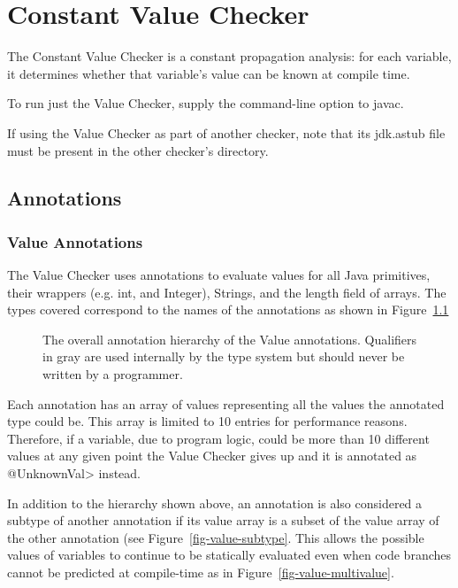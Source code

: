 \htmlhr
\chapter{Constant Value Checker\label{value-checker}}

The Constant Value Checker is a constant propagation analysis: for
each variable, it determines whether that variable's value can be
known at compile time.

To run just the Value Checker, supply the
command-line option to javac.

If using the Value Checker as part of another checker, note that its
jdk.astub file must be present in the other checker's directory.

\section{Annotations}
\subsection{Value Annotations}

The Value Checker uses annotations to evaluate values for all Java
primitives, their wrappers (e.g. int, and Integer), Strings, and the
length field of arrays. The types covered correspond to the names of
the annotations as shown in Figure~\ref{fig-value-hierarchy}

\begin{figure}
\caption{The overall annotation hierarchy of the Value
annotations. Qualifiers in gray are used
internally by the type system but should never be written by a
programmer.}
\label{fig-value-hierarchy}
\end{figure}

Each annotation has an array of values representing all the values the
annotated type could be. This array is limited to 10 entries for
performance reasons. Therefore, if a variable, due to program logic,
could be more than 10 different values at any given point the Value
Checker gives up and it is annotated as \<@UnknownVal> instead.

In addition to the hierarchy shown above, an annotation is also
considered a subtype of another annotation if its value array is a
subset of the value array of the other annotation (see
Figure~\ref{fig-value-subtype}. This allows the possible values of
variables to continue to be statically evaluated even when code branches cannot be
predicted at compile-time as in Figure~\ref{fig-value-multivalue}.

